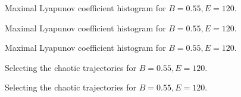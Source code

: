 \documentclass{beamer}
\begin{document}

\begin{frame}
	\begin{figure}
		
		\caption{Maximal Lyapunov coefficient histogram for \(B=0.55, E=120\).}
	\end{figure}
\end{frame}


\begin{frame}
	\begin{figure}
		
		\caption{Maximal Lyapunov coefficient histogram for \(B=0.55, E=120\).}
	\end{figure}
\end{frame}


\begin{frame}
	\begin{figure}
		
		\caption{Maximal Lyapunov coefficient histogram for \(B=0.55, E=120\).}
	\end{figure}
\end{frame}


\begin{frame}
	\begin{figure}
		
		\caption{Selecting the chaotic trajectories for \(B=0.55, E=120\).}
	\end{figure}
\end{frame}


\begin{frame}
	\begin{figure}
		
		\caption{Selecting the chaotic trajectories for \(B=0.55, E=120\).}
	\end{figure}
\end{frame}

\end{document}
